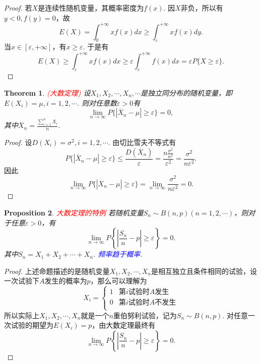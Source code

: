 \documentclass{article}
\newtheorem{theorem}{Theorem}[section]
\newtheorem{proposition}[theorem]{Proposition}
\newcommand{\redt}[1]{\textcolor{red}{#1}}
\newcommand{\bluet}[1]{\textcolor{blue}{#1}}
\begin{document}
\begin{proof}
若$X$是连续性随机变量，其概率密度为$f(x)$. 因$X$非负，所以有$y < 0,f(y)=0$，故
$$
E(X) = \int_{0}^{+\infty} xf(x)dx \geq  \int_{\varepsilon}^{+\infty} xf(x)dy.
$$
当$x \in [\varepsilon,+\infty]$，有$x \geq \varepsilon$. 于是有
$$
E(X) \geq \int_{\varepsilon}^{+\infty} xf(x)dx \geq \varepsilon \int_{\varepsilon}^{+\infty}f(x)dx = \varepsilon P\{X \geq \varepsilon\}.
$$
\end{proof}

\begin{theorem}
\rm \redt{(大数定理)} 设$X_1,X_2,\cdots,X_n,\cdots$是独立同分布的随机变量，即$E(X_i) = \mu,i=1,2,\cdots$. 则对任意数$\varepsilon > 0$有
$$
\lim\limits_{n \rightarrow \infty}P\{|\overline{X}_n -\mu| \geq \varepsilon\} = 0,
$$ 
其中$\overline{X}_n = \frac{\sum\limits_{i=1}^n X_i}{n}$. 
\end{theorem}

\begin{proof}
设$D(X_i) = \sigma^2, i =1,2,\cdots$. 由切比雪夫不等式有
$$
P\{|\overline{X}_n -\mu| \geq \varepsilon\} \leq \frac{D(\overline{X}_n)}{\varepsilon} = \frac{n\frac{\sigma^2}{n^2}}{\varepsilon^2} = \frac{\sigma^2}{n\varepsilon^2}. 
$$
因此
$$
\lim\limits_{n \rightarrow \infty} P\{|\overline{X}_n -\mu| \geq \varepsilon\} = \lim\limits_{n \rightarrow \infty} \frac{\sigma^2}{n\varepsilon^2} = 0.
$$
\end{proof}

\begin{proposition}
\rm \redt{大数定理的特例} 若随机变量$S_n \sim B(n,p)(n=1,2,\cdots)$，则对于任意$\varepsilon > 0$，有
$$
\lim\limits_{n \rightarrow \infty}P\left\{\left|\frac{S_n}{n} -p\right| \geq \varepsilon\right\} = 0.
$$
其中$S_n = X_1+X_2+\cdots+X_n$. \bluet{频率趋于概率}. 
\end{proposition}

\begin{proof}
\rm 上述命题描述的是随机变量$X_1,X_2,\cdots,X_n$是相互独立且条件相同的试验，设一次试验下$A$发生的概率为$p$，那么可以理解为
$$
X_i = \left\{  \begin{array}{ll}
1 & \text{第$i$试验时$A$发生}\\
0 & \text{第$i$试验时$A$不发生}\\
\end{array}  \right.
$$ 
所以实际上$X_1,X_2,\cdots,X_n$就是一个$n$重伯努利试验，记为$S_n \sim B(n,p)$. 对任意一次试验的期望为$E(X_i) = p$，由大数定理最终有
$$
\lim\limits_{n \rightarrow \infty}P\left\{\left|\frac{S_n}{n} -p\right| \geq \varepsilon\right\} = 0.
$$ 
\end{proof}
\end{document}
